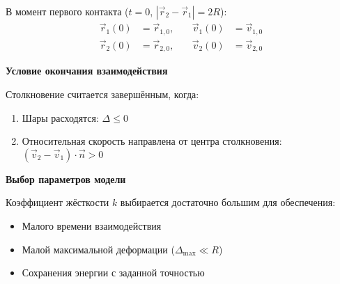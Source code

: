 В момент первого контакта ($t = 0$, $|\vec{r}_2 - \vec{r}_1| = 2R$):
\[
\begin{aligned}
\vec{r}_1(0) &= \vec{r}_{1,0}, & \quad \vec{v}_1(0) &= \vec{v}_{1,0} \\
\vec{r}_2(0) &= \vec{r}_{2,0}, & \quad \vec{v}_2(0) &= \vec{v}_{2,0}
\end{aligned}
\]

\begin{center}
    \textbf{Условие окончания взаимодействия}
\end{center}

Столкновение считается завершённым, когда:
\begin{enumerate}
    \item Шары расходятся: $\Delta \leq 0$
    \item Относительная скорость направлена от центра столкновения: $(\vec{v}_2 - \vec{v}_1) \cdot \vec{n} > 0$
\end{enumerate}

\begin{center}
    \textbf{Выбор параметров модели}
\end{center}

Коэффициент жёсткости $k$ выбирается достаточно большим для обеспечения:
\begin{itemize}
    \item Малого времени взаимодействия
    \item Малой максимальной деформации ($\Delta_{\max} \ll R$)
    \item Сохранения энергии с заданной точностью
\end{itemize}

